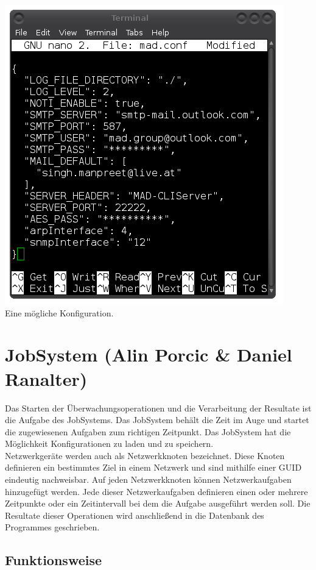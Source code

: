 \documentclass[12pt,a4paper]{report}
\begin{document}
\begin{center}
\includegraphics[scale=0.6]{img/madconf.png}\\
Eine mögliche Konfiguration.
\end{center}

\chapter{JobSystem (Alin Porcic \& Daniel Ranalter)}

Das Starten der Überwachungsoperationen und die Verarbeitung der Resultate ist die Aufgabe des JobSystems. Das JobSystem behält die Zeit im Auge und startet die zugewiesenen Aufgaben zum richtigen Zeitpunkt. Das JobSystem hat die Möglichkeit Konfigurationen zu laden und zu speichern.\\
Netzwerkgeräte werden auch als Netzwerkknoten bezeichnet. Diese Knoten definieren ein bestimmtes Ziel in einem Netzwerk und sind mithilfe einer GUID eindeutig nachweisbar. Auf jeden Netzwerkknoten können Netzwerkaufgaben hinzugefügt werden. Jede dieser Netzwerkaufgaben definieren einen oder mehrere Zeitpunkte oder ein Zeitintervall bei dem die Aufgabe ausgeführt werden soll. Die Resultate dieser Operationen wird anschließend in die Datenbank des Programmes geschrieben.

\section{Funktionsweise}
\end{document}
